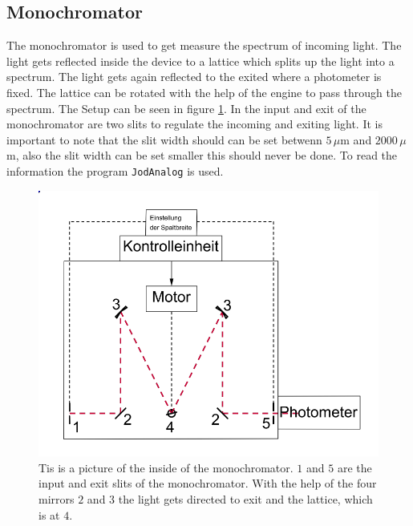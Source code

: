 \subsection{Monochromator}
The monochromator is used to get measure the spectrum of incoming light. The light gets reflected inside the device to a lattice which splits up the light into a spectrum. The light gets again reflected to the exited where a photometer is fixed. The lattice can be rotated with the help of the engine to pass through the spectrum. The Setup can be seen in figure \ref{figMono}.
In the input and exit of the monochromator are two slits to regulate the incoming and exiting light. It is important to note that the slit width should can be set betwenn $5\,\mu$m and $2000\,\mu$m, also the slit width can be set smaller this should never be done. To read the information the program \verb|JodAnalog| is used.
\begin{figure}[ht]
	\includegraphics[scale=0.6]{Bild/Mono}
	\centering
	\caption[Monochromator]{Tis is a picture of the inside of the monochromator. $1$ and $5$ are the input and exit slits of the monochromator. With the help of the four mirrors $2$ and $3$ the light gets directed to exit and the lattice, which is at $4$.\cite{Anleitung}}
	\label{figMono}
\end{figure}